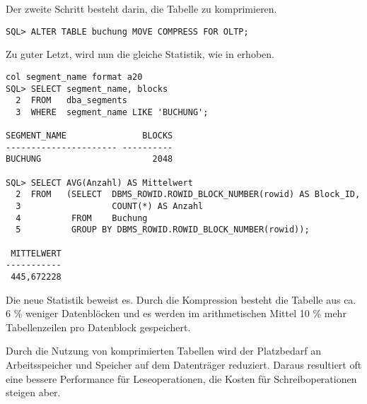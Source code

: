           Der zweite Schritt besteht darin, die Tabelle  zu komprimieren.
          \begin{lstlisting}[caption={Komprimieren der Tabelle \identifier{Buchung}},label=admin308,language=oracle_sql]
SQL> ALTER TABLE buchung MOVE COMPRESS FOR OLTP;
          \end{lstlisting}
\clearpage		  
          Zu guter Letzt, wird nun die gleiche Statistik, wie in  erhoben.
          \begin{lstlisting}[caption={Anzahl der Datenblöcke + durchschnittliche Anzahl der Zeilen pro Block nach der Kompression},label=admin309,language=oracle_sql,alsolanguage=sqlplus]
col segment_name format a20
SQL> SELECT segment_name, blocks
  2  FROM   dba_segments
  3  WHERE  segment_name LIKE 'BUCHUNG';

SEGMENT_NAME               BLOCKS
---------------------- ----------
BUCHUNG                      2048

SQL> SELECT AVG(Anzahl) AS Mittelwert
  2  FROM   (SELECT  DBMS_ROWID.ROWID_BLOCK_NUMBER(rowid) AS Block_ID,
  3                  COUNT(*) AS Anzahl
  4          FROM    Buchung
  5          GROUP BY DBMS_ROWID.ROWID_BLOCK_NUMBER(rowid));

 MITTELWERT
-----------
 445,672228
          \end{lstlisting}
          Die neue Statistik beweist es. Durch die Kompression besteht die Tabelle  aus ca. 6 \% weniger Datenblöcken und es werden im arithmetischen Mittel 10 \% mehr Tabellenzeilen pro Datenblock gespeichert.
          \begin{merke}
            Durch die Nutzung von komprimierten Tabellen wird der Platzbedarf an Arbeitsspeicher und Speicher auf dem Datenträger reduziert. Daraus resultiert oft eine bessere Performance für Leseoperationen, die Kosten für Schreiboperationen steigen aber.
          \end{merke}
